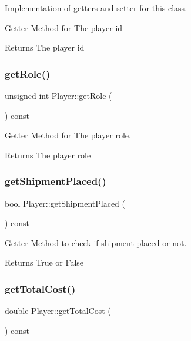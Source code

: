Implementation of getters and setter for this class. 

Getter Method for The player id \begin{DoxyReturn}{Returns}
The player id 
\end{DoxyReturn}
\mbox{\label{classPlayer_af78ce362224fb94149c6cf84dd34f9ea}} 
\subsubsection{\texorpdfstring{get\+Role()}{getRole()}}
{\footnotesize\ttfamily unsigned int Player\+::get\+Role (\begin{DoxyParamCaption}{ }\end{DoxyParamCaption}) const}



Getter Method for The player role. 

\begin{DoxyReturn}{Returns}
The player role 
\end{DoxyReturn}
\mbox{\label{classPlayer_a90c450a83447d63a40c22eca44624121}} 
\subsubsection{\texorpdfstring{get\+Shipment\+Placed()}{getShipmentPlaced()}}
{\footnotesize\ttfamily bool Player\+::get\+Shipment\+Placed (\begin{DoxyParamCaption}{ }\end{DoxyParamCaption}) const}



Getter Method to check if shipment placed or not. 

\begin{DoxyReturn}{Returns}
True or False 
\end{DoxyReturn}
\mbox{\label{classPlayer_a0c5cd74a628ad6fb79ebb790dd1a956b}} 
\subsubsection{\texorpdfstring{get\+Total\+Cost()}{getTotalCost()}}
{\footnotesize\ttfamily double Player\+::get\+Total\+Cost (\begin{DoxyParamCaption}{ }\end{DoxyParamCaption}) const}



